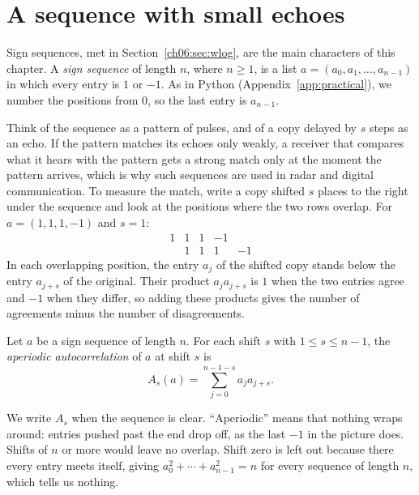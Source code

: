 \section{A sequence with small echoes}\label{ch14:sec:aperiodic}
Sign sequences, met in Section~\ref{ch06:sec:wlog}, are the main characters of this chapter. A \emph{sign sequence} of length $n$, where $n\ge1$, is a list $a=(a_0,a_1,\ldots,a_{n-1})$ in which every entry is $1$ or $-1$. As in Python (Appendix~\ref{app:practical}), we number the positions from $0$, so the last entry is $a_{n-1}$.

Think of the sequence as a pattern of pulses, and of a copy delayed by $s$ steps as an echo. If the pattern matches its echoes only weakly, a receiver that compares what it hears with the pattern gets a strong match only at the moment the pattern arrives, which is why such sequences are used in radar and digital communication. To measure the match, write a copy shifted $s$ places to the right under the sequence and look at the positions where the two rows overlap. For $a=(1,1,1,-1)$ and $s=1$:
\[
\begin{array}{rrrrr}
1&1&1&-1&\\
 &1&1&1&-1
\end{array}
\]
In each overlapping position, the entry $a_j$ of the shifted copy stands below the entry $a_{j+s}$ of the original. Their product $a_ja_{j+s}$ is $1$ when the two entries agree and $-1$ when they differ, so adding these products gives the number of agreements minus the number of disagreements.

\par\noindent\begin{minipage}{\linewidth}
\begin{definition}\label{ch14:def:aperiodic}
Let $a$ be a sign sequence of length $n$. For each shift $s$ with $1\le s\le n-1$, the \emph{aperiodic autocorrelation} of $a$ at shift $s$ is
\[
A_s(a)=\sum_{j=0}^{n-1-s}a_j a_{j+s}.
\]
\end{definition}
\end{minipage}\par

We write $A_s$ when the sequence is clear. ``Aperiodic'' means that nothing wraps around: entries pushed past the end drop off, as the last $-1$ in the picture does. Shifts of $n$ or more would leave no overlap. Shift zero is left out because there every entry meets itself, giving $a_0^2+\cdots+a_{n-1}^2=n$ for every sequence of length $n$, which tells us nothing.

